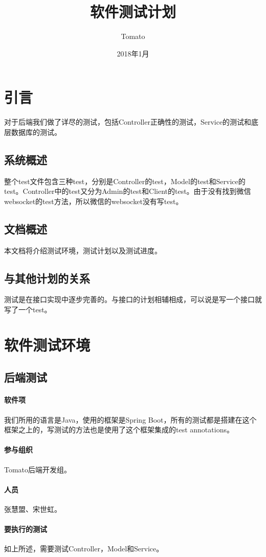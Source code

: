 \documentclass{article}
\title{软件测试计划}
\author{Tomato}
\date{2018年1月}
\begin{document}
	\maketitle
		\section{引言}
			对于后端我们做了详尽的测试，包括Controller正确性的测试，Service的测试和底层数据库的测试。
			\subsection{系统概述}
				整个test文件包含三种test，分别是Controller的test，Model的test和Service的test。Controller中的test又分为Admin的test和Client的test。由于没有找到微信websocket的test方法，所以微信的websocket没有写test。
			\subsection{文档概述}
				本文档将介绍测试环境，测试计划以及测试进度。
			\subsection{与其他计划的关系}
				测试是在接口实现中逐步完善的。与接口的计划相辅相成，可以说是写一个接口就写了一个test。
		\section{软件测试环境}
			\subsection{后端测试}
				\paragraph{软件项}
					我们所用的语言是Java，使用的框架是Spring Boot，所有的测试都是搭建在这个框架之上的，写测试的方法也是使用了这个框架集成的test annotations。
				\paragraph{参与组织}
					Tomato后端开发组。
				\paragraph{人员}
					张慧盟、宋世虹。
				\paragraph{要执行的测试}
					如上所述，需要测试Controller，Model和Service。
\end{document}
